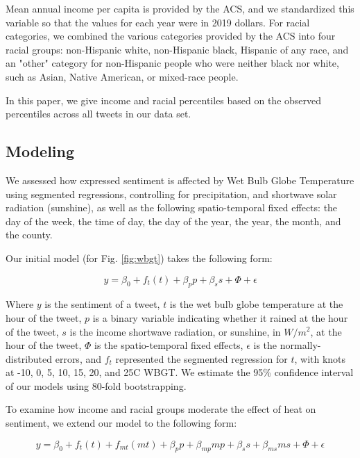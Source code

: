\documentclass[fleqn,10pt]{wlscirep}
\begin{document}
Mean annual income per capita is provided by the ACS, and we standardized this variable so that the values for each year were in 2019 dollars.  For racial categories, we combined the various categories provided by the ACS into four racial groups: non-Hispanic white, non-Hispanic black, Hispanic of any race, and an "other" category for non-Hispanic people who were neither black nor white, such as Asian, Native American, or mixed-race people.

In this paper, we give income and racial percentiles based on the observed percentiles across all tweets in our data set.
    
\subsection*{Modeling}
We assessed how expressed sentiment is affected by Wet Bulb Globe Temperature using segmented regressions, controlling for precipitation, and shortwave solar radiation (sunshine), as well as the following spatio-temporal fixed effects: the day of the week, the time of day, the day of the year, the year, the month, and the county.  

Our initial model (for Fig. \ref{fig:wbgt}) takes the following form:

\begin{equation}
    y = \beta_0 + f_t(t) + \beta_p p + \beta_s s + \Phi + \epsilon
    \label{mod:1}
\end{equation}

Where $y$ is the sentiment of a tweet, $t$ is the wet bulb globe temperature at the hour of the tweet, $p$ is a binary variable indicating whether it rained at the hour of the tweet, $s$ is the income shortwave radiation, or sunshine, in $W/m^2$, at the hour of the tweet, $\Phi$ is the spatio-temporal fixed effects, $\epsilon$ is the normally-distributed errors, and $f_t$ represented the segmented regression for $t$, with knots at -10\textdegree, 0\textdegree, 5\textdegree, 10\textdegree, 15\textdegree, 20\textdegree, and 25\textdegree C WBGT.  We estimate the 95\% confidence interval of our models using 80-fold bootstrapping.  

To examine how income and racial groups moderate the effect of heat on sentiment, we extend our model to the following form:

\begin{equation}
    y = \beta_0 + f_t(t) + f_{mt}(m t) + \beta_p p + \beta_{mp} m p + \beta_s s + \beta_{ms} m s + \Phi + \epsilon
    \label{mod:2}
\end{equation}
\end{document}
